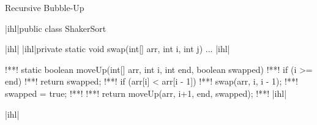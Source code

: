 {
\begin{frame}[c,fragile]{Recursive Bubble-Up}
\SetupLstHl
\begin{plainjava}
|ihl|public class ShakerSort {|ihl|
    |ihl|private static void swap(int[] arr, int i, int j) { ... }|ihl|

!**!    static boolean moveUp(int[] arr, int i, int end, boolean swapped) {
!**!        if (i >= end)
!**!            return swapped;
!**!        if (arr[i] < arr[i - 1]) {
!**!            swap(arr, i, i - 1);
!**!            swapped = true;
!**!        }
!**!        return moveUp(arr, i+1, end, swapped);
!**!    }
|ihl|}|ihl|
\end{plainjava}
\end{frame}
}


